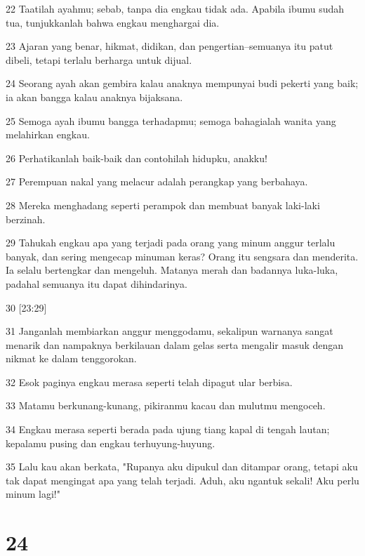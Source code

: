 \par 22 Taatilah ayahmu; sebab, tanpa dia engkau tidak ada. Apabila ibumu sudah tua, tunjukkanlah bahwa engkau menghargai dia.
\par 23 Ajaran yang benar, hikmat, didikan, dan pengertian--semuanya itu patut dibeli, tetapi terlalu berharga untuk dijual.
\par 24 Seorang ayah akan gembira kalau anaknya mempunyai budi pekerti yang baik; ia akan bangga kalau anaknya bijaksana.
\par 25 Semoga ayah ibumu bangga terhadapmu; semoga bahagialah wanita yang melahirkan engkau.
\par 26 Perhatikanlah baik-baik dan contohilah hidupku, anakku!
\par 27 Perempuan nakal yang melacur adalah perangkap yang berbahaya.
\par 28 Mereka menghadang seperti perampok dan membuat banyak laki-laki berzinah.
\par 29 Tahukah engkau apa yang terjadi pada orang yang minum anggur terlalu banyak, dan sering mengecap minuman keras? Orang itu sengsara dan menderita. Ia selalu bertengkar dan mengeluh. Matanya merah dan badannya luka-luka, padahal semuanya itu dapat dihindarinya.
\par 30 [23:29]
\par 31 Janganlah membiarkan anggur menggodamu, sekalipun warnanya sangat menarik dan nampaknya berkilauan dalam gelas serta mengalir masuk dengan nikmat ke dalam tenggorokan.
\par 32 Esok paginya engkau merasa seperti telah dipagut ular berbisa.
\par 33 Matamu berkunang-kunang, pikiranmu kacau dan mulutmu mengoceh.
\par 34 Engkau merasa seperti berada pada ujung tiang kapal di tengah lautan; kepalamu pusing dan engkau terhuyung-huyung.
\par 35 Lalu kau akan berkata, "Rupanya aku dipukul dan ditampar orang, tetapi aku tak dapat mengingat apa yang telah terjadi. Aduh, aku ngantuk sekali! Aku perlu minum lagi!"

\chapter{24}

